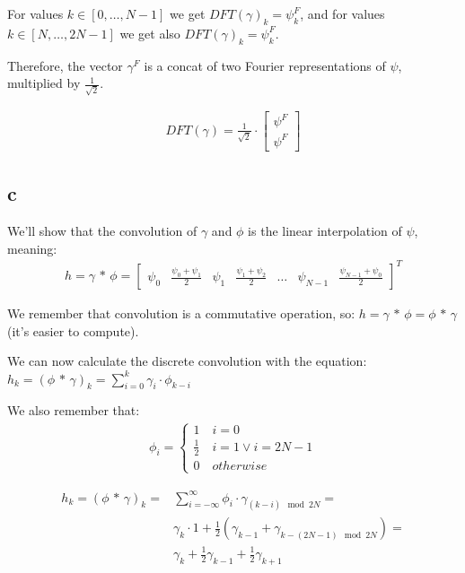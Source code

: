 \documentclass[english]{extarticle}
\numberwithin{equation}{section}
\numberwithin{figure}{section}
\begin{document}
For values $k\in [0,\dots,N-1]$ we get $DFT(\gamma)_k=\psi_{k}^{F}$, and for values $k \in [N,\dots,2N-1]$ we get also $DFT(\gamma)_k=\psi_{k}^{F}$.

Therefore, the vector $\gamma^{F}$ is a concat of two Fourier representations of $\psi$, multiplied by $\frac{1}{\sqrt{2}}$.

\begin{align*}
    DFT(\gamma) = \frac{1}{\sqrt{2}} \cdot \begin{bmatrix} \psi^{F} \\ \psi^{F} \end{bmatrix}
\end{align*}

\subsection*{c}

We'll show that the convolution of $\gamma$ and $\phi$ is the linear interpolation of $\psi$, meaning:
\begin{align*}
    h=\gamma\, * \, \phi = 
    \begin{bmatrix} 
    \psi_0 & \frac{\psi_0 + \psi_1}{2} & \psi_1 & \frac{\psi_1 + \psi_2}{2} & \dots & \psi_{N-1} & \frac{\psi_{N-1} + \psi_0}{2}
    \end{bmatrix}^T
\end{align*}

We remember that convolution is a commutative operation, so: $h=\gamma\, * \, \phi = \phi\, * \, \gamma$ (it's easier to compute).

We can now calculate the discrete convolution with the equation: $h_{k} = (\phi\, * \, \gamma)_{k} = \sum_{i=0}^{k} \gamma_{i} \cdot \phi_{k-i}$

We also remember that: 
\begin{align*}
    \phi_i = \begin{cases}
        1 \quad i=0 \\
        \frac{1}{2} \quad i=1 \lor i=2N-1 \\
        0 \quad otherwise
    \end{cases}    
\end{align*}

\begin{align*}
    h_{k} = (\phi\, * \, \gamma)_{k} = & \sum_{i=-\infty}^{\infty} \phi_{i} \cdot \gamma_{(k-i)\mod 2N} = \\
    & \gamma_k \cdot 1 + \frac{1}{2} (\gamma_{k-1} + \gamma_{k-(2N-1) \mod 2N} ) = \\
    & \gamma_k + \frac{1}{2} \gamma_{k-1} + \frac{1}{2} \gamma_{k+1}
\end{align*}
\end{document}
